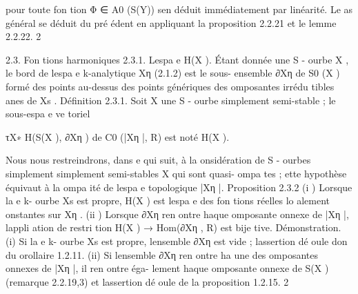 \documentclass[
  10pt,
]{article}
\newenvironment{Shaded}{}{}
\newcommand{\NormalTok}[1]{#1}
\begin{document}
\begin{Shaded}
\begin{Highlighting}[]
\NormalTok{pour toute fon tion Φ ∈ A0 (S(Y)) s\textquotesingle{}en déduit immédiatement par linéarité.}
\NormalTok{    Le as général se déduit du pré édent en appliquant la proposition 2.2.21 et le lemme 2.2.22.}
\NormalTok{2}


\NormalTok{                                   2.3. Fon tions harmoniques}
\NormalTok{2.3.1. L\textquotesingle{}espa e H(X ).}
\NormalTok{   Étant donnée une S {-} ourbe X , le bord de l\textquotesingle{}espa e k{-}analytique Xη (2.1.2) est le sous{-}}
\NormalTok{ensemble ∂Xη de S0 (X ) formé des points au{-}dessus des points génériques des omposantes}
\NormalTok{irrédu tibles anes de Xs .}
\NormalTok{Définition 2.3.1.  Soit X une S {-} ourbe simplement semi{-}stable ; le sous{-}espa e ve toriel}

\NormalTok{                                           τX∗ H(S(X ), ∂Xη )}
\NormalTok{de C0 (|Xη |, R) est noté H(X ).}

\NormalTok{   Nous nous restreindrons, dans e qui suit, à la onsidération de S {-} ourbes simplement}
\NormalTok{simplement semi{-}stables X qui sont quasi{-} ompa tes ; ette hypothèse équivaut à la ompa ité}
\NormalTok{de l\textquotesingle{}espa e topologique |Xη |.}
\NormalTok{Proposition 2.3.2}
\NormalTok{  (i ) Lorsque la e}
\NormalTok{                  k{-} ourbe Xs est propre, H(X ) est l\textquotesingle{}espa e des fon tions réelles lo alement}
\NormalTok{ onstantes sur Xη .}
\NormalTok{  (ii ) Lorsque ∂Xη ren ontre haque omposante onnexe de |Xη |, l\textquotesingle{}appli ation de restri tion}
\NormalTok{                                         H(X ) → Hom(∂Xη , R)}
\NormalTok{est bije tive.}
\NormalTok{Démonstration.}
\NormalTok{(i) Si la e}
\NormalTok{          k{-} ourbe Xs est propre, l\textquotesingle{}ensemble ∂Xη est vide ; l\textquotesingle{}assertion dé oule don du orollaire}
\NormalTok{1.2.11.}
\NormalTok{(ii) Si l\textquotesingle{}ensemble ∂Xη ren ontre ha une des omposantes onnexes de |Xη |, il ren ontre éga{-}}
\NormalTok{lement haque omposante onnexe de S(X ) (remarque 2.2.19,3) et l\textquotesingle{}assertion dé oule de la}
\NormalTok{proposition 1.2.15.                                                                           2}


\end{Highlighting}
\end{Shaded}
\end{document}
